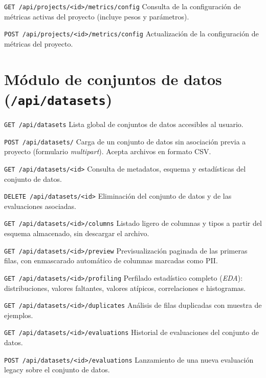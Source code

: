 \begin{definitionlist}
  \item[\texttt{GET /api/projects/<id>/metrics/config}]  Consulta de la
    configuración de métricas activas del proyecto (incluye pesos y
    parámetros).

  \item[\texttt{POST /api/projects/<id>/metrics/config}]  Actualización de
    la configuración de métricas del proyecto.
\end{definitionlist}


\section{Módulo de conjuntos de datos (\texttt{/api/datasets})}
\label{sec:api-datasets}

\begin{definitionlist}
  \item[\texttt{GET /api/datasets}]  Lista global de conjuntos de datos
    accesibles al usuario.

  \item[\texttt{POST /api/datasets/}]  Carga de un conjunto de datos sin
    asociación previa a proyecto (formulario \emph{multipart}).  Acepta
    archivos en formato \ac{CSV}.

  \item[\texttt{GET /api/datasets/<id>}]  Consulta de metadatos, esquema y
    estadísticas del conjunto de datos.

  \item[\texttt{DELETE /api/datasets/<id>}]  Eliminación del conjunto de
    datos y de las evaluaciones asociadas.

  \item[\texttt{GET /api/datasets/<id>/columns}]  Listado ligero de columnas
    y tipos a partir del esquema almacenado, sin descargar el archivo.

  \item[\texttt{GET /api/datasets/<id>/preview}]  Previsualización paginada
    de las primeras filas, con enmascarado automático de columnas marcadas
    como \ac{PII}.

  \item[\texttt{GET /api/datasets/<id>/profiling}]  Perfilado estadístico
    completo (\emph{EDA}): distribuciones, valores faltantes, valores
    atípicos, correlaciones e histogramas.

  \item[\texttt{GET /api/datasets/<id>/duplicates}]  Análisis de filas
    duplicadas con muestra de ejemplos.

  \item[\texttt{GET /api/datasets/<id>/evaluations}]  Historial de
    evaluaciones del conjunto de datos.

  \item[\texttt{POST /api/datasets/<id>/evaluations}]  Lanzamiento de una
    nueva evaluación legacy sobre el conjunto de datos.
\end{definitionlist}


